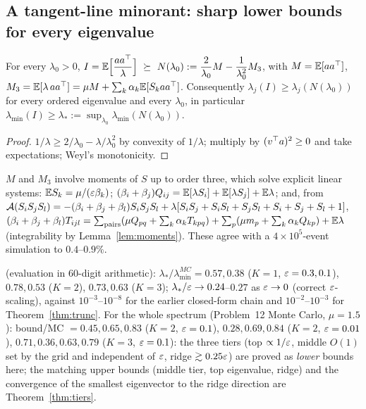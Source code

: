 \subsection{A tangent-line minorant: sharp lower bounds for every eigenvalue}\label{sec:tangent}

\begin{theorem}\label{thm:tangent}\Pt{}
For every $\lambda_0>0$, $\displaystyle I=\E\Big[\frac{aa\T}{\lambda}\Big]\ \succeq\ N(\lambda_0):=\frac2{\lambda_0}M-\frac1{\lambda_0^2}M_3$, with $M=\mathbb{E}[aa^{\top}]$, $M_3=\mathbb{E}[\lambda\,aa^{\top}]=\mu M+\sum_k\alpha_k\mathbb{E}[S_kaa^{\top}]$. Consequently $\lambda_j(I)\ge\lambda_j(N(\lambda_0))$ for every ordered eigenvalue and every $\lambda_0$, in particular $\lambda_{\min}(I)\ge\lambda_*:=\sup_{\lambda_0}\lambda_{\min}(N(\lambda_0))$.
\end{theorem}
\begin{proof}
$1/\lambda\ge2/\lambda_0-\lambda/\lambda_0^2$ by convexity of $1/\lambda$; multiply by $(v^{\top} a)^2\ge0$ and take expectations; Weyl's monotonicity.
\end{proof}
$M$ and $M_3$ involve moments of $S$ up to order three, which solve explicit linear systems: $\mathbb{E} S_k=\mu/(\varepsilon\beta_k)$; $(\beta_i+\beta_j)Q_{ij}=\mathbb{E}[\lambda S_i]+\mathbb{E}[\lambda S_j]+\mathbb{E}\lambda$; and, from $\mathcal A(S_iS_jS_l)=-(\beta_i+\beta_j+\beta_l)S_iS_jS_l+\lambda[S_iS_j+S_iS_l+S_jS_l+S_i+S_j+S_l+1]$, $(\beta_i+\beta_j+\beta_l)T_{ijl}=\sum_{\text{pairs}}(\mu Q_{pq}+\sum_k\alpha_kT_{kpq})+\sum_p(\mu m_p+\sum_k\alpha_kQ_{kp})+\mathbb{E}\lambda$ (integrability by Lemma~\ref{lem:moments}). These agree with a $4\times10^5$-event simulation to $0.4$--$0.9\%$.

\Nt{} (evaluation in 60-digit arithmetic): $\lambda_*/\lambda_{\min}^{MC}=0.57,0.38$ ($K=1$, $\varepsilon=0.3,0.1$), $0.78,0.53$ ($K=2$), $0.73,0.63$ ($K=3$); $\lambda_*/\varepsilon\to0.24$--$0.27$ as $\varepsilon\to0$ (correct $\varepsilon$-scaling), against $10^{-3}$--$10^{-8}$ for the earlier closed-form chain and $10^{-2}$--$10^{-3}$ for Theorem~\ref{thm:trunc}. For the whole spectrum (Problem~12 Monte Carlo, $\mu=1.5$): bound/MC $=0.45,0.65,0.83$ ($K=2$, $\varepsilon=0.1$), $0.28,0.69,0.84$ ($K=2$, $\varepsilon=0.01$), $0.71,0.36,0.63,0.79$ ($K=3$, $\varepsilon=0.1$): the three tiers (top $\propto1/\varepsilon$, middle $O(1)$ set by the grid and independent of $\varepsilon$, ridge $\gtrsim0.25\varepsilon$) are proved as \emph{lower} bounds here; the matching upper bounds (middle tier, top eigenvalue, ridge) and the convergence of the smallest eigenvector to the ridge direction are Theorem~\ref{thm:tiers}.

